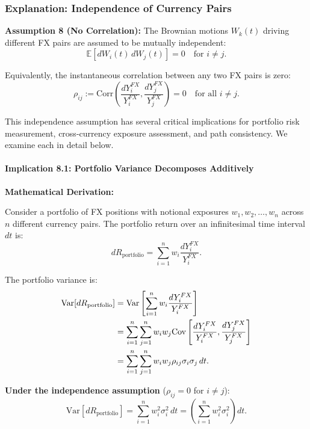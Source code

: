 \newpage
\subsubsection{Explanation: Independence of Currency Pairs}

\textbf{Assumption 8 (No Correlation):} The Brownian motions $W_k(t)$ driving different FX pairs are assumed to be mutually independent:
\begin{equation}
	\mathbb{E}[dW_i(t)\,dW_j(t)] = 0 \quad \text{for } i \neq j.
\end{equation}

Equivalently, the instantaneous correlation between any two FX pairs is zero:
\begin{equation}
	\rho_{ij} := \text{Corr}\left(\frac{dY_i^{FX}}{Y_i^{FX}}, \frac{dY_j^{FX}}{Y_j^{FX}}\right) = 0 \quad \text{for all } i \neq j.
\end{equation}

This independence assumption has several critical implications for portfolio risk measurement, cross-currency exposure assessment, and path consistency. We examine each in detail below.

\paragraph{Implication 8.1: Portfolio Variance Decomposes Additively}

\textbf{Mathematical Derivation:}

Consider a portfolio of FX positions with notional exposures $w_1, w_2, \ldots, w_n$ across $n$ different currency pairs. The portfolio return over an infinitesimal time interval $dt$ is:
\begin{equation}
	dR_{\text{portfolio}} = \sum_{i=1}^n w_i \frac{dY_i^{FX}}{Y_i^{FX}}.
\end{equation}

The portfolio variance is:
\begin{align}
	\text{Var}[dR_{\text{portfolio}}] &= \text{Var}\left[\sum_{i=1}^n w_i \frac{dY_i^{FX}}{Y_i^{FX}}\right] \notag \\
	&= \sum_{i=1}^n \sum_{j=1}^n w_i w_j \text{Cov}\left[\frac{dY_i^{FX}}{Y_i^{FX}}, \frac{dY_j^{FX}}{Y_j^{FX}}\right] \notag \\
	&= \sum_{i=1}^n \sum_{j=1}^n w_i w_j \rho_{ij} \sigma_i \sigma_j \, dt.
\end{align}

\textbf{Under the independence assumption} ($\rho_{ij} = 0$ for $i \neq j$):
\begin{equation}
	\text{Var}[dR_{\text{portfolio}}] = \sum_{i=1}^n w_i^2 \sigma_i^2 \, dt = \left(\sum_{i=1}^n w_i^2 \sigma_i^2\right) dt.
\end{equation}

